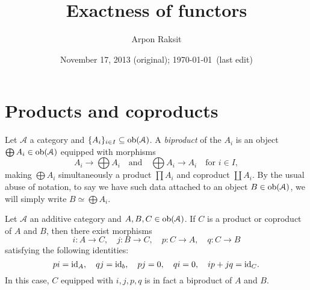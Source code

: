 


\title{Exactness of functors}
\author{Arpon Raksit}
\date{November 17, 2013 (original); \today\ (last edit)}


\maketitle
\thispagestyle{fancy}


\renewcommand{\A}{\mathcal{A}}
\renewcommand{\B}{\mathcal{B}}


\section{Products and coproducts}

\begin{definition}
  \label{biproduct}
  Let $\A$ a category and $\{A_i\}_{i \in I} \subseteq \ob(\A)$. A
  \emph{biproduct} of the $A_i$ is an object $\bigoplus A_i \in
  \ob(\A)$ equipped with morphisms
  \[
  \textstyle{A_i \to \bigoplus A_i \quad\text{and}\quad \bigoplus A_i
    \to A_i \quad \text{for }i \in I,}
  \]
  making $\bigoplus A_i$ simultaneously a product $\prod A_i$ and
  coproduct $\coprod A_i$. By the usual abuse of notation, to say we
  have such data attached to an object $B \in \ob(\A)$, we will simply
  write $B \simeq \bigoplus A_i$.
\end{definition}

\begin{lemma}
  \label{biproduct-formulae}
  Let $\A$ an additive category and $A,B,C \in \ob(\A)$. If $C$ is a
  product or coproduct of $A$ and $B$, then there exist morphisms
  \[
  i : A \to C, \quad j : B \to C, \quad p : C \to A, \quad q : C \to B
  \]
  satisfying the following identities:
  \[
  pi = \mathrm{id}_A, \quad qj = \mathrm{id}_b, \quad pj = 0, \quad qi = 0, \quad
  ip+jq = \mathrm{id}_C.
  \]
  In this case, $C$ equipped with $i,j,p,q$ is in fact a biproduct of
  $A$ and $B$.
\end{lemma}

